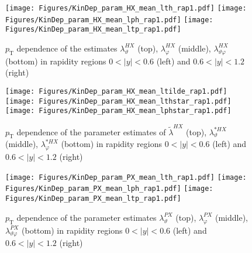 \documentclass[12pt]{article}
\newcommand{\pT}{p_\mathrm{T}}
\newcommand{\absy}{\left |  y \right |}
\newcommand{\lamthHX}{\lambda^{\scriptscriptstyle HX}_\vartheta}
\newcommand{\lamphHX}{\lambda^{\scriptscriptstyle HX}_\varphi}
\newcommand{\lamthphHX}{\lambda^{\scriptscriptstyle HX}_{\vartheta \varphi}}
\newcommand{\lamtildeHX}{\tilde{\lambda}^{\scriptscriptstyle HX}}
\newcommand{\lamthstarHX}{\lambda^{* \scriptscriptstyle HX}_\vartheta}
\newcommand{\lamphstarHX}{\lambda^{* \scriptscriptstyle HX}_\varphi}
\newcommand{\lamthPX}{\lambda^{\scriptscriptstyle PX}_\vartheta}
\newcommand{\lamphPX}{\lambda^{\scriptscriptstyle PX}_\varphi}
\newcommand{\lamthphPX}{\lambda^{\scriptscriptstyle PX}_{\vartheta \varphi}}
\begin{document}



\begin{figure}[htbp]
\centering
\texttt{[image: Figures/KinDep\_param\_HX\_mean\_lth\_rap1.pdf]}
\texttt{[image: Figures/KinDep\_param\_HX\_mean\_lph\_rap1.pdf]}
\texttt{[image: Figures/KinDep\_param\_HX\_mean\_ltp\_rap1.pdf]}
\caption{$\pT$ dependence of the estimates $\lamthHX$ (top), $\lamphHX$ (middle), $\lamthphHX$ (bottom) in rapidity regions $0<\absy<0.6$ (left) and $0.6<\absy<1.2$ (right)}
\end{figure}
\clearpage

\begin{figure}[htbp]
\centering
\texttt{[image: Figures/KinDep\_param\_HX\_mean\_ltilde\_rap1.pdf]}
\texttt{[image: Figures/KinDep\_param\_HX\_mean\_lthstar\_rap1.pdf]}
\texttt{[image: Figures/KinDep\_param\_HX\_mean\_lphstar\_rap1.pdf]}
\caption{$\pT$ dependence of the parameter estimates of $\lamtildeHX$ (top),
$\lamthstarHX$ (middle), $\lamphstarHX$ (bottom) in rapidity regions $0<\absy<0.6$ (left) and $0.6<\absy<1.2$ (right)}
\end{figure}
\clearpage









\begin{figure}[htbp]
\centering
\texttt{[image: Figures/KinDep\_param\_PX\_mean\_lth\_rap1.pdf]}
\texttt{[image: Figures/KinDep\_param\_PX\_mean\_lph\_rap1.pdf]}
\texttt{[image: Figures/KinDep\_param\_PX\_mean\_ltp\_rap1.pdf]}
\caption{$\pT$ dependence of the parameter estimates $\lamthPX$ (top), $\lamphPX$ (middle), $\lamthphPX$ (bottom) in rapidity regions $0<\absy<0.6$ (left) and $0.6<\absy<1.2$ (right)}
\end{figure}
\clearpage
\end{document}

